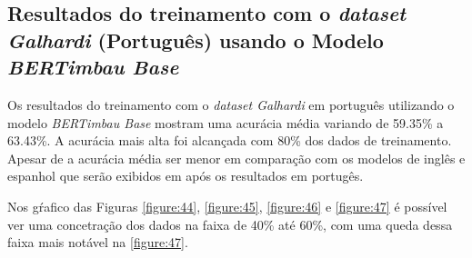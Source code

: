 \subsection{Resultados do treinamento com o \textit{dataset Galhardi} (Português) usando o Modelo \textit{BERTimbau Base}}

Os resultados do treinamento com o \textit{dataset Galhardi} em português utilizando o modelo \textit{BERTimbau Base} mostram uma acurácia média variando de 59.35\% a 63.43\%. A acurácia mais alta foi alcançada com 80\% dos dados de treinamento. Apesar de a acurácia média ser menor em comparação com os modelos de inglês e espanhol que serão exibidos em após os resultados em portugês.

\begin{table}[h!]
\centering
{}
\caption{Resultados de Regressão para Diferentes Percentuais de Treino com o \textit{dataset Galhardi} (Português) usando o Modelo \textit{BERTimbau Base}}
\label{tab:resultados_regressao_portugues_base}
\end{table}

Nos gŕafico das Figuras \ref{figure:44}, \ref{figure:45}, \ref{figure:46} e \ref{figure:47}  é possível ver uma concetração dos dados na faixa de 40\% até 60\%, com uma queda dessa faixa mais notável na \ref{figure:47}.




\FloatBarrier


